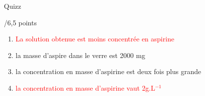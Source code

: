 \begin{doc}{Quizz \begin{large}
    /6,5 points
\end{large}}
\begin{enumerate}
        \begin{enumerate}[label=\textit{\alph*.}, align=left, leftmargin=*]
            \item \textcolor{red}{La solution obtenue est moins concentrée en aspirine}
            \item la masse d'aspire dans le verre est 2000 mg
            \item la concentration en masse d'aspirine est deux fois plus grande 
            \item \textcolor{red}{la concentration en masse d'aspirine vaut 2g.L$^{-1}$}
        \end{enumerate}
\end{enumerate}
\end{doc}


